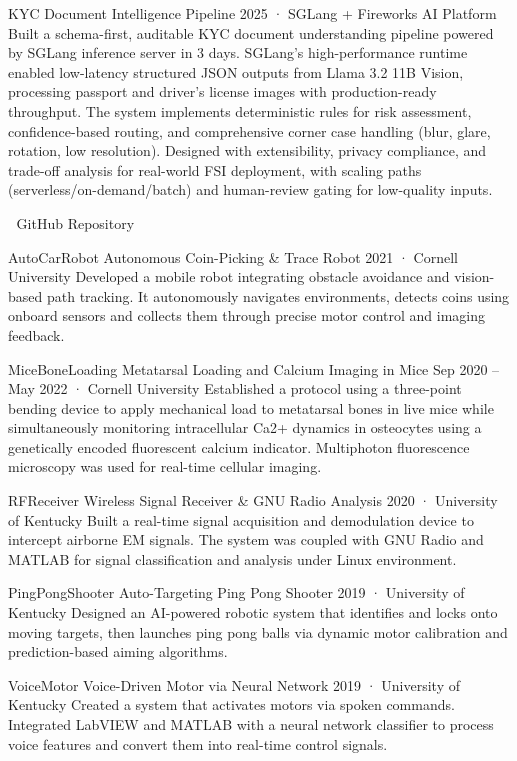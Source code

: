 
KYC Document Intelligence Pipeline
2025 · SGLang + Fireworks AI Platform
Built a schema-first, auditable KYC document understanding pipeline powered by SGLang inference server in 3 days. SGLang's high-performance runtime enabled low-latency structured JSON outputs from Llama 3.2 11B Vision, processing passport and driver's license images with production-ready throughput. The system implements deterministic rules for risk assessment, confidence-based routing, and comprehensive corner case handling (blur, glare, rotation, low resolution). Designed with extensibility, privacy compliance, and trade-off analysis for real-world FSI deployment, with scaling paths (serverless/on-demand/batch) and human-review gating for low-quality inputs.

🔗 GitHub Repository

AutoCarRobot
Autonomous Coin-Picking & Trace Robot
2021 · Cornell University
Developed a mobile robot integrating obstacle avoidance and vision-based path tracking. It autonomously navigates environments, detects coins using onboard sensors and collects them through precise motor control and imaging feedback.

MiceBoneLoading
Metatarsal Loading and Calcium Imaging in Mice
Sep 2020 – May 2022 · Cornell University
Established a protocol using a three-point bending device to apply mechanical load to metatarsal bones in live mice while simultaneously monitoring intracellular Ca2+ dynamics in osteocytes using a genetically encoded fluorescent calcium indicator. Multiphoton fluorescence microscopy was used for real-time cellular imaging.

RFReceiver
Wireless Signal Receiver & GNU Radio Analysis
2020 · University of Kentucky
Built a real-time signal acquisition and demodulation device to intercept airborne EM signals. The system was coupled with GNU Radio and MATLAB for signal classification and analysis under Linux environment.

PingPongShooter
Auto-Targeting Ping Pong Shooter
2019 · University of Kentucky
Designed an AI-powered robotic system that identifies and locks onto moving targets, then launches ping pong balls via dynamic motor calibration and prediction-based aiming algorithms.

VoiceMotor
Voice-Driven Motor via Neural Network
2019 · University of Kentucky
Created a system that activates motors via spoken commands. Integrated LabVIEW and MATLAB with a neural network classifier to process voice features and convert them into real-time control signals.

